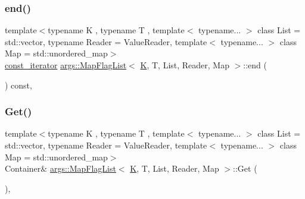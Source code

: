 \mbox{\label{classargs_1_1_map_flag_list_ac6c7c678cc3680a6df82b972aeaee561}} 
\subsubsection{\texorpdfstring{end()}{end()}\hspace{0.1cm}{\footnotesize\ttfamily [2/2]}}
{\footnotesize\ttfamily template$<$typename K , typename T , template$<$ typename... $>$ class List = std\+::vector, typename Reader  = Value\+Reader, template$<$ typename... $>$ class Map = std\+::unordered\+\_\+map$>$ \\
\hyperlink{classargs_1_1_map_flag_list_a6b59eb2e45bf0e576d01b902f3c7a0d7}{const\+\_\+iterator} \hyperlink{classargs_1_1_map_flag_list}{args\+::\+Map\+Flag\+List}$<$ \hyperlink{cgal__test_8cpp_a891e241aa245ae63618f03737efba309}{K}, T, List, Reader, Map $>$\+::end (\begin{DoxyParamCaption}{ }\end{DoxyParamCaption}) const\hspace{0.3cm}{\ttfamily [inline]}, {\ttfamily [noexcept]}}

\mbox{\label{classargs_1_1_map_flag_list_ada0e7eb9bec54ed768bfa206af4b3bb9}} 
\subsubsection{\texorpdfstring{Get()}{Get()}}
{\footnotesize\ttfamily template$<$typename K , typename T , template$<$ typename... $>$ class List = std\+::vector, typename Reader  = Value\+Reader, template$<$ typename... $>$ class Map = std\+::unordered\+\_\+map$>$ \\
Container\& \hyperlink{classargs_1_1_map_flag_list}{args\+::\+Map\+Flag\+List}$<$ \hyperlink{cgal__test_8cpp_a891e241aa245ae63618f03737efba309}{K}, T, List, Reader, Map $>$\+::Get (\begin{DoxyParamCaption}{ }\end{DoxyParamCaption})\hspace{0.3cm}{\ttfamily [inline]}, {\ttfamily [noexcept]}}

